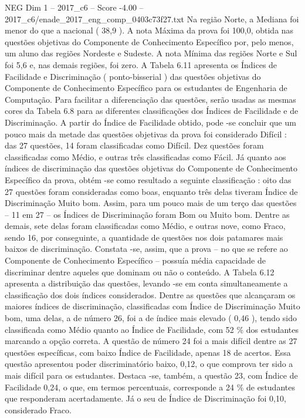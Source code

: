 \begin{textsample}{NEG Dim 1 – 2017\_c6 – Score -4.00 – 2017\_c6/enade\_2017\_eng\_comp\_0403c73f27.txt}
Na região Norte, a Mediana foi menor do que a nacional ( 38,9 ).
A nota Máxima da prova foi 100,0, obtida nas questões objetivas do Componente de Conhecimento Específico por, pelo menos, um aluno das regiões Nordeste e Sudeste.
A nota Mínima das regiões Norte e Sul foi 5,6 e, nas demais regiões, foi zero.
A Tabela 6.11 apresenta os Índices de Facilidade e Discriminação ( ponto-bisserial ) das questões objetivas do Componente de Conhecimento Específico para os estudantes de Engenharia de Computação.
Para facilitar a diferenciação das questões, serão usadas as mesmas cores da Tabela 6.8 para as diferentes classificações dos Índices de Facilidade e de Discriminação.
A partir do Índice de Facilidade obtido, pode -se concluir que um pouco mais da metade das questões objetivas da prova foi considerado Difícil : das 27 questões, 14 foram classificadas como Difícil.
Dez questões foram classificadas como Médio, e outras três classificadas como Fácil.
Já quanto aos índices de discriminação das questões objetivas do Componente de Conhecimento Específico da prova, obtém -se como resultado a seguinte classificação : oito das 27 questões foram consideradas como boas, enquanto três delas tiveram Índice de Discriminação Muito bom.
Assim, para um pouco mais de um terço das questões – 11 em 27 – os Índices de Discriminação foram Bom ou Muito bom.
Dentre as demais, sete delas foram classificadas como Médio, e outras nove, como Fraco, sendo 16, por conseguinte, a quantidade de questões nos dois patamares mais baixos de discriminação.
Constata -se, assim, que a prova – no que se refere ao Componente de Conhecimento Específico – possuía média capacidade de discriminar dentre aqueles que dominam ou não o conteúdo.
A Tabela 6.12 apresenta a distribuição das questões, levando -se em conta simultaneamente a classificação dos dois índices considerados.
Dentre as questões que alcançaram os maiores índices de discriminação, classificadas com Índice de Discriminação Muito bom, uma delas, a de número 26, foi a de índice mais elevado ( 0,46 ), tendo sido classificada como Médio quanto ao Índice de Facilidade, com 52 \% dos estudantes marcando a opção correta.
A questão de número 24 foi a mais difícil dentre as 27 questões específicas, com baixo Índice de Facilidade, apenas 18 de acertos.
Essa questão apresentou poder discriminatório baixo, 0,12, o que comprova ter sido a mais difícil para os estudantes.
Destaca -se, também, a questão 23, com Índice de Facilidade 0,24, o que, em termos percentuais, corresponde a 24 \% de estudantes que responderam acertadamente.
Já o seu de Índice de Discriminação foi 0,10, considerado Fraco.

\end{textsample}
